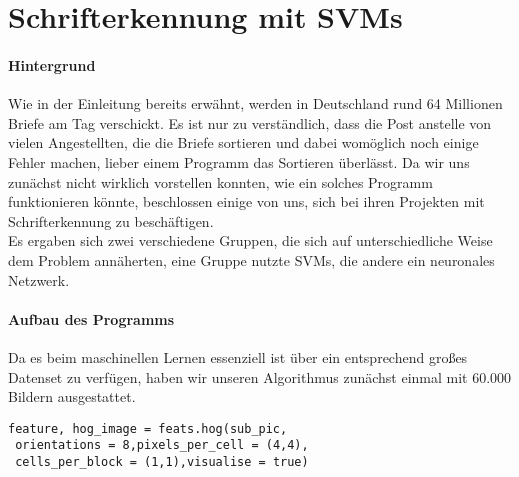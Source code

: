 \section{Schrifterkennung mit SVMs}

\paragraph{Hintergrund}
Wie in der Einleitung bereits erwähnt, werden in Deutschland rund 64 Millionen Briefe am Tag verschickt. Es ist nur zu verständlich, dass die Post anstelle von vielen Angestellten, die die Briefe sortieren und dabei womöglich noch einige Fehler machen, lieber einem Programm das Sortieren überlässt. Da wir uns zunächst nicht wirklich vorstellen konnten, wie ein solches Programm funktionieren könnte, beschlossen einige von uns, sich bei ihren Projekten mit Schrifterkennung zu beschäftigen.\\
Es ergaben sich zwei verschiedene Gruppen, die sich auf unterschiedliche Weise dem Problem annäherten, eine Gruppe nutzte SVMs, die andere ein neuronales Netzwerk.


\paragraph{Aufbau des Programms}
Da es beim maschinellen Lernen essenziell ist über ein entsprechend großes Datenset zu verfügen, haben wir unseren Algorithmus zunächst einmal mit 60.000 Bildern ausgestattet. 

\begin{verbatim}
feature, hog_image = feats.hog(sub_pic,
 orientations = 8,pixels_per_cell = (4,4),
 cells_per_block = (1,1),visualise = true)
\end{verbatim}

